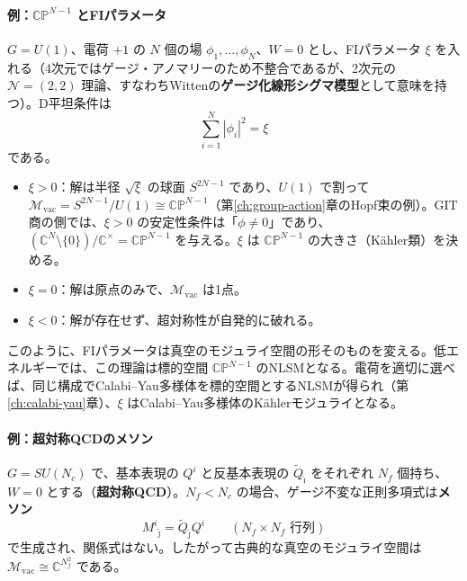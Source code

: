 \documentclass[uplatex, dvipdfmx, book]{jsbook}
\begin{document}
\paragraph{例：$\mathbb{CP}^{N-1}$ とFIパラメータ}
$G = U(1)$、電荷 $+1$ の $N$ 個の場 $\phi_1, \dots, \phi_N$、$W = 0$ とし、FIパラメータ $\xi$ を入れる（4次元ではゲージ・アノマリーのため不整合であるが、2次元の $\mathcal{N} = (2,2)$ 理論、すなわちWittenの\textbf{ゲージ化線形シグマ模型}\cite{witten1993phases}として意味を持つ）。D平坦条件は
\begin{equation}
    \sum_{i=1}^{N} |\phi_i|^2 = \xi
\end{equation}
である。
\begin{itemize}
    \item $\xi > 0$：解は半径 $\sqrt{\xi}$ の球面 $S^{2N-1}$ であり、$U(1)$ で割って $\mathcal{M}_{\text{vac}} = S^{2N-1}/U(1) \cong \mathbb{CP}^{N-1}$（第\ref{ch:group-action}章のHopf束の例）。GIT商の側では、$\xi > 0$ の安定性条件は「$\phi \neq 0$」であり、$(\mathbb{C}^N \setminus \{0\})/\mathbb{C}^\times = \mathbb{CP}^{N-1}$ を与える。$\xi$ は $\mathbb{CP}^{N-1}$ の大きさ（K\"ahler類）を決める。
    \item $\xi = 0$：解は原点のみで、$\mathcal{M}_{\text{vac}}$ は1点。
    \item $\xi < 0$：解が存在せず、超対称性が自発的に破れる。
\end{itemize}
このように、FIパラメータは真空のモジュライ空間の形そのものを変える。低エネルギーでは、この理論は標的空間 $\mathbb{CP}^{N-1}$ のNLSMとなる。電荷を適切に選べば、同じ構成でCalabi--Yau多様体を標的空間とするNLSMが得られ（第\ref{ch:calabi-yau}章）、$\xi$ はCalabi--Yau多様体のK\"ahlerモジュライとなる。

\paragraph{例：超対称QCDのメソン}
$G = SU(N_c)$ で、基本表現の $Q^i$ と反基本表現の $\tilde{Q}_{\tilde{\imath}}$ をそれぞれ $N_f$ 個持ち、$W = 0$ とする（\textbf{超対称QCD}）。$N_f < N_c$ の場合、ゲージ不変な正則多項式は\textbf{メソン}
\begin{equation}
    M^i{}_{\tilde{\jmath}} = \tilde{Q}_{\tilde{\jmath}} Q^i \qquad (N_f \times N_f \text{ 行列})
\end{equation}
で生成され、関係式はない。したがって古典的な真空のモジュライ空間は $\mathcal{M}_{\text{vac}} \cong \mathbb{C}^{N_f^2}$ である。
\end{document}
